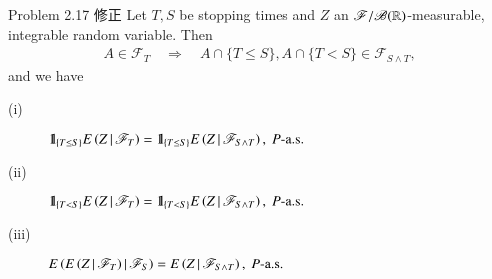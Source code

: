 	\begin{itembox}[l]{Problem 2.17 修正}\label{chapter_1_Problem_2_17}
		Let $T,S$ be stopping times and $Z$ an $\mathscr{F}/\mathscr{B}(\mathbb{R})$-measurable, 
		integrable random variable. Then
		\begin{align}
			A \in \mathscr{F}_T \quad \Rightarrow \quad A \cap \{T \leq S\}, A \cap \{T < S\} \in \mathscr{F}_{S \wedge T},
		\end{align}
		and we have
		\begin{description}
			\item[(i)] $\mbox{1}\hspace{-0.25em}\mbox{l}_{\{T \leq S\}} E\left( Z \, \middle|\, \mathscr{F}_T \right) = \mbox{1}\hspace{-0.25em}\mbox{l}_{\{T \leq S\}} E\left( Z \, \middle|\, \mathscr{F}_{S \wedge T} \right),\ \mbox{$P$-a.s.}$
			\item[(ii)] $\mbox{1}\hspace{-0.25em}\mbox{l}_{\{T < S\}} E\left( Z \, \middle|\, \mathscr{F}_T \right) = \mbox{1}\hspace{-0.25em}\mbox{l}_{\{T < S\}} E\left( Z \, \middle|\, \mathscr{F}_{S \wedge T} \right),\ \mbox{$P$-a.s.}$
			\item[(iii)] $E\left( E\left( Z \, \middle|\, \mathscr{F}_T \right) \, \middle|\, \mathscr{F}_S \right) = E\left( Z \, \middle|\, \mathscr{F}_{S \wedge T} \right),\ \mbox{$P$-a.s.}$
		\end{description}
	\end{itembox}
	
